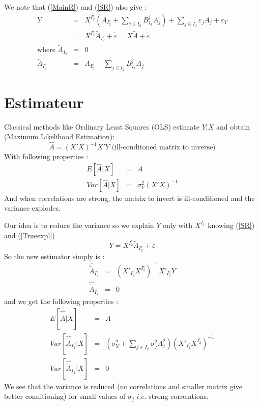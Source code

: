 \documentclass[12pt]{article}
\begin{document}
We note that (\ref{MainR}) and (\ref{SR}) also give :
\begin{eqnarray}
	Y&=&X^{I_2^c} (A_{I_2^c}+ \sum_{j \in I_2}B^{j}_{I_1}A_{j})+  \sum_{j \in I_2}\varepsilon_{j}A_{j}+\varepsilon_Y \\
					&=& X^{I_2^c}\tilde{A}_{I_2^c}+ \tilde{\varepsilon}=X\tilde{A}+ \tilde{\varepsilon}\label{Trueexpl} \\
			\textrm{where }		\tilde{A}_{I_2}&=&0 \\
					\tilde{A}_{I_2^c}&=&A_{I_2^c}+ \sum_{j \in I_2}B^{j}_{I_1}A_{j} 
\end{eqnarray}
\section{Estimateur}
	Classical methods like Ordinary Least Squares (OLS) estimate $Y|X$ and obtain (Maximum Likelihood Estimation): 
		\begin{equation}
			\hat A = (X'X)^{-1}X'Y \textrm{ (ill-conditoned matrix to inverse)}
		\end{equation}
		With following properties :
		\begin{eqnarray}
			E[\hat{A}|X]&=&A \\
			Var[\hat{A}|X]&=& \sigma_Y^2(X'X)^{-1}
		\end{eqnarray}				
		And when correlations are strong, the matrix to invert is ill-conditioned and the variance explodes.
 			
		Our idea is to reduce the variance so we explain $Y$ only with $X^{I_1}$ knowing (\ref{SR}) and (\ref{Trueexpl})
			\begin{equation}
				Y= X^{I_2^c}\tilde{A}_{I_2^c}+ \tilde{\varepsilon}\label{explicatif}
			\end{equation}							
		So the new estimator simply is : 
		\begin{eqnarray}
			\hat{\tilde{A}}_{I_2^c} &=& (X'_{I_2^c} X^{I_2^c})^{-1}X'_{I_2^c}Y \\
			\hat{\tilde{A}}_{I_2} &=& 0
		\end{eqnarray}
		and we get the following properties :
		\begin{eqnarray}
			E[\hat{\tilde{A}}|X]&=&\tilde{A} \\
			Var[\hat{\tilde{A}}_{I_2^c}|X]&=& (\sigma^2_Y+\sum_{j \in I_2}\sigma^2_{j}A_{j}^2 )(X'_{I_2^c} X^{I_2^c})^{-1} \\
			Var[\hat{\tilde{A}}_{I_2}|X]&=& 0 
		\end{eqnarray}
		We see that the variance is reduced (no correlations and smaller matrix give better conditioning) for small values of $\sigma_j$ $i.e.$ strong correlations.					
		
\end{document}
